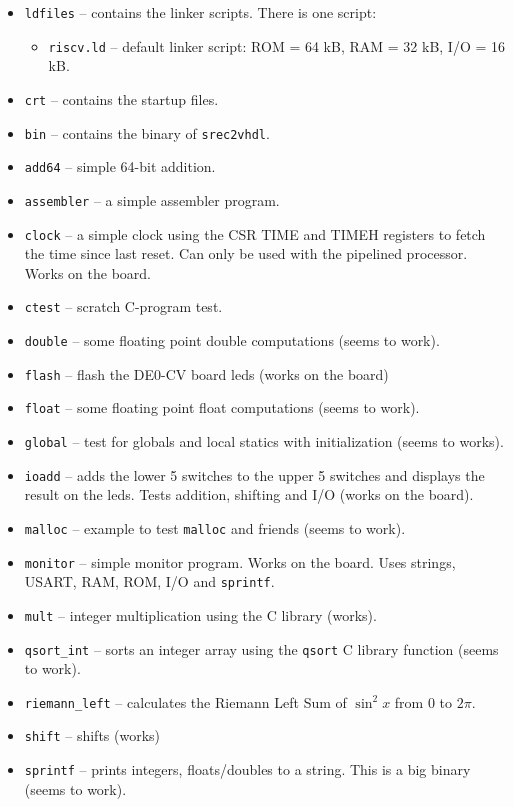 \documentclass[12pt]{article}
\begin{document}
\begin{itemize}
\item \texttt{ldfiles} -- contains the linker scripts. There is one script:
\begin{itemize}
\item \texttt{riscv.ld} -- default linker script: ROM = 64 kB, RAM = 32 kB, I/O = 16 kB.
\end{itemize}
\item \texttt{crt} -- contains the startup files.
\item \texttt{bin} -- contains the binary of \texttt{srec2vhdl}.
\item \texttt{add64} -- simple 64-bit addition.
\item \texttt{assembler} -- a simple assembler program.
\item \texttt{clock} -- a simple clock using the CSR TIME and TIMEH registers to fetch the time since last reset. Can only be used with the pipelined processor. Works on the board.
\item \texttt{ctest} -- scratch C-program test.
\item \texttt{double} -- some floating point double computations (seems to work).
\item \texttt{flash} -- flash the DE0-CV board leds (works on the board)
\item \texttt{float} -- some floating point float computations (seems to work).
\item \texttt{global} -- test for globals and local statics with initialization (seems to works).
\item \texttt{ioadd} -- adds the lower 5 switches to the upper 5 switches and displays the result on the leds. Tests addition, shifting and I/O (works on the board).
\item \texttt{malloc} -- example to test \texttt{malloc} and friends (seems to work).
\item \texttt{monitor} -- simple monitor program. Works on the board. Uses strings, USART, RAM, ROM, I/O and \texttt{sprintf}.
\item \texttt{mult} -- integer multiplication using the C library (works).
\item \texttt{qsort\_int} -- sorts an integer array using the \texttt{qsort} C library function (seems to work).
\item \texttt{riemann\_left} -- calculates the Riemann Left Sum of $\sin^2 x$ from $0$ to $2\pi$.
\item \texttt{shift} -- shifts (works)
\item \texttt{sprintf} -- prints integers, floats/doubles to a string. This is a big binary (seems to work).

\end{itemize}
\end{document}
